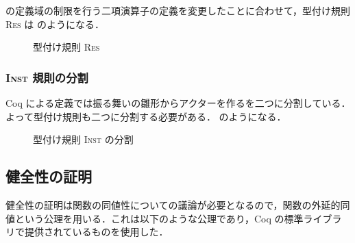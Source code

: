 \tmp の定義域の制限を行う二項演算子の定義を変更したことに合わせて，型付け規則 \textsc{Res} は  のようになる．

\begin{figure*}[t]
  \caption{型付け規則 \textsc{Res}}
  \label{api:res_rule}
\end{figure*}

\subsubsection{\textsc{Inst} 規則の分割}

Coq による定義では振る舞いの雛形からアクターを作る\conf を二つに分割している．よって型付け規則も二つに分割する必要がある． のようになる．

\begin{figure*}[t]
  \vspace{14pt}
  \caption{型付け規則 \textsc{Inst} の分割}
  \label{api:inst_rule}
\end{figure*}





\subsection{健全性の証明}


健全性の証明は関数の同値性についての議論が必要となるので，関数の外延的同値という公理を用いる．これは以下のような公理であり，Coq の標準ライブラリで提供されているものを使用した．%

